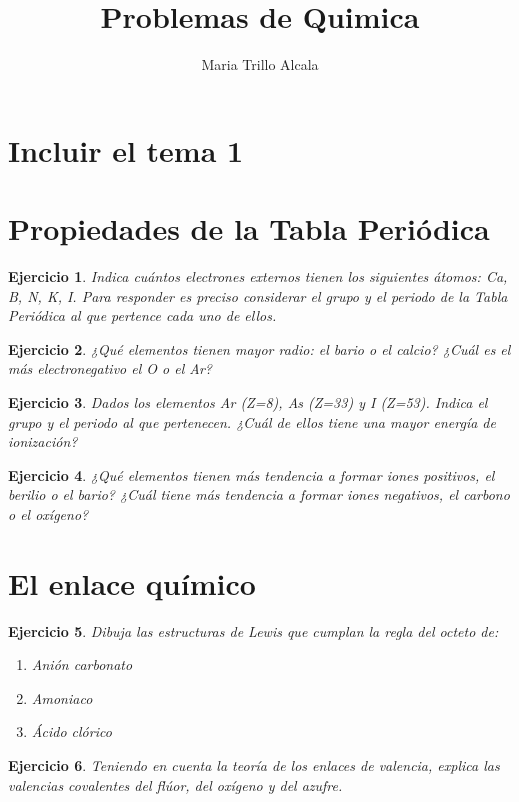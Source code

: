 \documentclass[11pt,twoside,a4paper]{article}
\title{Problemas de Quimica}
\author{Maria Trillo Alcala}
\theoremstyle{problem}
\newtheorem{prob}{Ejercicio}[section]
\begin{document}
\section{Incluir el tema 1}

\section{Propiedades de la Tabla Periódica}

\begin{prob}
Indica cuántos electrones externos tienen los siguientes átomos: Ca, B, N, K, I.
Para responder es preciso considerar el grupo y el periodo de la Tabla Periódica al que pertence
cada uno de ellos. 
\end{prob}


\begin{prob}
¿Qué elementos tienen mayor radio: el bario o el calcio? ¿Cuál es el más electronegativo el O o el Ar?
\end{prob}


\begin{prob}
Dados los elementos Ar (Z=8), As (Z=33) y I (Z=53). Indica el grupo y el periodo al que pertenecen.
¿Cuál de ellos tiene una mayor energía de ionización? 
\end{prob}


\begin{prob}
¿Qué elementos tienen más tendencia a formar iones positivos, el berilio o el bario?
¿Cuál tiene más tendencia a formar iones negativos, el carbono o el oxígeno?
\end{prob}


\section{El enlace químico}

\begin{prob}
Dibuja las estructuras de Lewis que cumplan la regla del octeto de:
\begin{enumerate}
	\item Anión carbonato
	\item Amoniaco
	\item Ácido clórico
\end{enumerate}
\end{prob}


\begin{prob}
Teniendo en cuenta la teoría de los enlaces de valencia, explica las valencias
covalentes del flúor, del oxígeno y del azufre. 
\end{prob}
\end{document}
